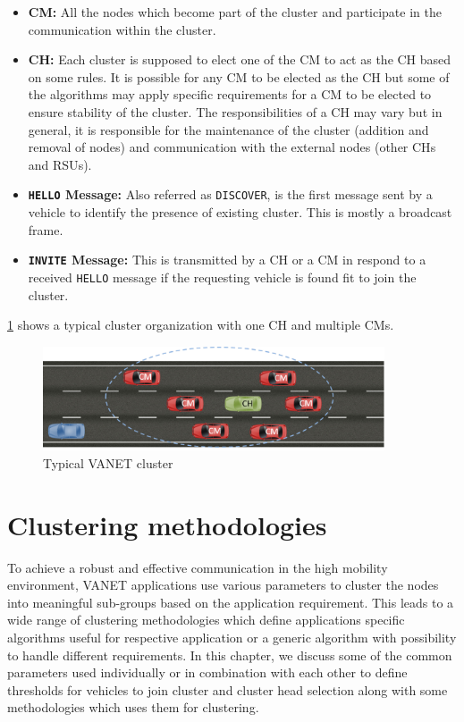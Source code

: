 \documentclass[]{ccs-thesis}
\begin{document}
\begin{itemize}
    \item \textbf{\ac{CM}:} All the nodes which become part of the cluster and participate in the
          communication within the cluster.
    \item \textbf{\ac{CH}:} Each cluster is supposed to elect one of the \ac{CM} to act as the \ac{CH}
          based on some rules. It is possible for any \ac{CM} to be elected as the \ac{CH} but some of the algorithms
          may apply specific requirements for a \ac{CM} to be elected to ensure stability of the cluster. The responsibilities
          of a \ac{CH} may vary but in general, it is responsible for the maintenance of the cluster
          (addition and removal of nodes) and communication with the external nodes (other \ac{CH}s and \ac{RSU}s).
    \item \textbf{\texttt{HELLO} Message:} Also referred as \texttt{DISCOVER}, is the first message sent by a vehicle to identify
          the presence of existing cluster. This is mostly a broadcast frame.
    \item \textbf{\texttt{INVITE} Message:} This is transmitted by a \ac{CH} or a \ac{CM} in respond to a received \texttt{HELLO} message
          if the requesting vehicle is found fit to join the cluster.
\end{itemize}

\cref{fig:cluster} shows a typical cluster organization with one \ac{CH} and multiple \ac{CM}s.

\begin{figure}[h]%
    \centering
    \includegraphics[width=0.9\textwidth]{figures/cluster}
    \caption{Typical \ac{VANET} cluster }
    \label{fig:cluster}
\end{figure}

\chapter{Clustering methodologies}
\label{sec:methodologies}

To achieve a robust and effective communication in the high mobility environment, \ac{VANET} applications use various
parameters to cluster the nodes into meaningful sub-groups based on the application requirement. This leads to a wide
range of clustering methodologies which define applications specific algorithms useful for respective application or
a generic algorithm with possibility to handle different requirements. In this chapter, we discuss some of the common
parameters used individually or in combination with each other to define thresholds for vehicles to join cluster and
cluster head selection along with some methodologies which uses them for clustering.
\end{document}
